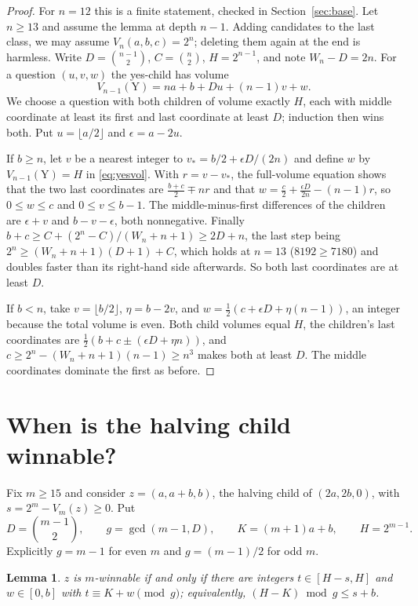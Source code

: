 \documentclass[11pt]{amsart}
\newtheorem{lemma}[thm]{Lemma}
\theoremstyle{definition}
\newcommand{\Y}{\mathrm{Y}}
\begin{document}
\begin{proof}
For $n=12$ this is a finite statement, checked in Section~\ref{sec:base}. Let $n\ge13$ and assume the lemma at depth
$n-1$. Adding candidates to the last class, we may assume $V_n(a,b,c)=2^n$; deleting them again at the end is
harmless. Write $D=\binom{n-1}2$, $C=\binom n2$, $H=2^{n-1}$, and note $W_n-D=2n$. For a question $(u,v,w)$ the
yes-child has volume
\begin{equation}\label{eq:yesvol}
V_{n-1}(\Y)=na+b+Du+(n-1)v+w .
\end{equation}
We choose a question with both children of volume exactly $H$, each with middle coordinate at least its first and last
coordinate at least $D$; induction then wins both. Put $u=\lfloor a/2\rfloor$ and $\epsilon=a-2u$.

If $b\ge n$, let $v$ be a nearest integer to $v_*=b/2+\epsilon D/(2n)$ and define $w$ by $V_{n-1}(\Y)=H$ in
\eqref{eq:yesvol}. With $r=v-v_*$, the full-volume equation shows that the two last coordinates are
$\tfrac{b+c}2\mp nr$ and that $w=\tfrac c2+\tfrac{\epsilon D}{2n}-(n-1)r$, so $0\le w\le c$ and $0\le v\le b-1$. The
middle-minus-first differences of the children are $\epsilon+v$ and $b-v-\epsilon$, both nonnegative. Finally
$b+c\ge C+(2^n-C)/(W_n+n+1)\ge2D+n$, the last step being $2^n\ge(W_n+n+1)(D+1)+C$, which holds at $n=13$
($8192\ge7180$) and doubles faster than its right-hand side afterwards. So both last coordinates are at least $D$.

If $b<n$, take $v=\lfloor b/2\rfloor$, $\eta=b-2v$, and $w=\tfrac12(c+\epsilon D+\eta(n-1))$, an integer because the
total volume is even. Both child volumes equal $H$, the children's last coordinates are
$\tfrac12(b+c\pm(\epsilon D+\eta n))$, and $c\ge2^n-(W_n+n+1)(n-1)\ge n^3$ makes both at least $D$. The middle
coordinates dominate the first as before.
\end{proof}

\section{When is the halving child winnable?}\label{sec:crit}

Fix $m\ge15$ and consider $z=(a,a+b,b)$, the halving child of $(2a,2b,0)$, with $s=2^m-V_m(z)\ge0$. Put
\[
D=\binom{m-1}2,\qquad g=\gcd(m-1,D),\qquad K=(m+1)a+b,\qquad H=2^{m-1}.
\]
Explicitly $g=m-1$ for even $m$ and $g=(m-1)/2$ for odd $m$.

\begin{lemma}\label{lem:crit}
$z$ is $m$-winnable if and only if there are integers $t\in[H-s,H]$ and $w\in[0,b]$ with $t\equiv K+w\pmod g$;
equivalently, $(H-K)\bmod g\le s+b$.
\end{lemma}
\end{document}
